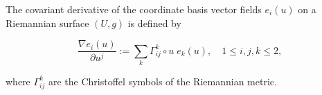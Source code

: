 The covariant derivative of the coordinate basis vector fields $e_i(u)$ on a Riemannian surface $(U, g)$ is defined by

$$\frac{\nabla e_i(u)}{\partial u^j} := \sum_k \Gamma_{ij}^k \circ u \; e_k(u), \quad 1 \leq i, j, k \leq 2,$$

where $\Gamma_{ij}^k$ are the Christoffel symbols of the Riemannian metric.
